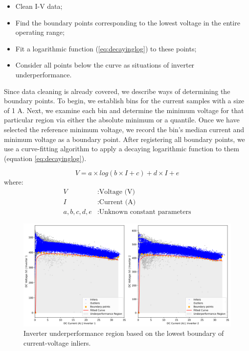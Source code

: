 \begin{itemize}
	\item Clean I-V data;
	\item Find the boundary points corresponding to the lowest voltage in the entire operating range;
	\item Fit a logarithmic function (\ref{eq:decayinglog}) to these points;
	\item Consider all points below the curve as situations of inverter underperformance.
\end{itemize}


Since data cleaning is already covered, we describe ways of determining the boundary points.
To begin, we establish bins for the current samples with a size of 1 A. Next, we examine each bin and determine the minimum voltage for that particular region via either the absolute minimum or a quantile. Once we have selected the reference minimum voltage, we record the bin's median current and minimum voltage as a boundary point.
After registering all boundary points, we use a curve-fitting algorithm to apply a decaying logarithmic function to them (equation \ref{eq:decayinglog}).

\begin{equation} \label{eq:decayinglog}
    V = a \times log(b \times I + c) + d \times I + e 
\end{equation}
where:
\begin{align*}
    V & : \text{Voltage (V)} \\
    I & : \text{Current (A)} \\
    a,b,c,d,e & : \text{Unknown constant parameters}
\end{align*}

\begin{figure}[h!]
    \centering
    \includegraphics[width=\textwidth]{figures/chapter5/algorithm/30_boundary-1.png}
    \caption{Inverter underperformance region based on the lowest boundary of current-voltage inliers.}
    \label{fig:anomaly_decision_boundary}
\end{figure}

